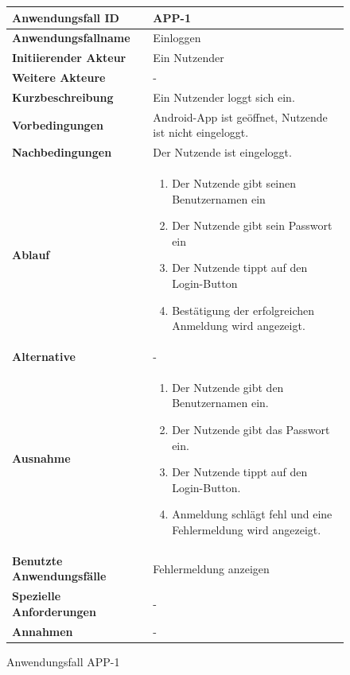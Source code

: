 \newpage

\begin{figure}[h]
	\centering
	\begin{tabularx}{\textwidth}{ X | X }
		\textbf{Anwendungsfall ID} & APP-1 \\ \hline
		\textbf{Anwendungsfallname} & Einloggen \\ \hline
		\textbf{Initiierender Akteur} & Ein Nutzender \\ \hline
		\textbf{Weitere Akteure} & -  \\ \hline
		\textbf{Kurzbeschreibung} & Ein Nutzender loggt sich ein. \\ \hline
		\textbf{Vorbedingungen} & Android-App ist geöffnet, Nutzende ist nicht eingeloggt. \\ \hline
		\textbf{Nachbedingungen} & Der Nutzende ist eingeloggt. \\ \hline
		\textbf{Ablauf} &
			\begin{enumerate}
				\item Der Nutzende gibt seinen Benutzernamen ein
				\item Der Nutzende gibt sein Passwort ein
				\item Der Nutzende tippt auf den Login-Button
				\item Bestätigung der erfolgreichen Anmeldung wird angezeigt.
			\end{enumerate} \\ \hline
		\textbf{Alternative} &
				- \\ \hline
		\textbf{Ausnahme} &
				\begin{enumerate}
					\item Der Nutzende gibt den Benutzernamen ein.
					\item Der Nutzende gibt das Passwort ein.
					\item Der Nutzende tippt auf den Login-Button.
					\item Anmeldung schlägt fehl und eine Fehlermeldung wird angezeigt.
				\end{enumerate}  \\ \hline
		\textbf{Benutzte Anwendungsfälle} & Fehlermeldung anzeigen \\ \hline
		\textbf{Spezielle Anforderungen} & - \\ \hline
		\textbf{Annahmen} & -
	\end{tabularx}
	\caption{Anwendungsfall APP-1}
	\label{fig:anwendungsfall-app-tabelle-APP-1}
\end{figure}

\newpage

